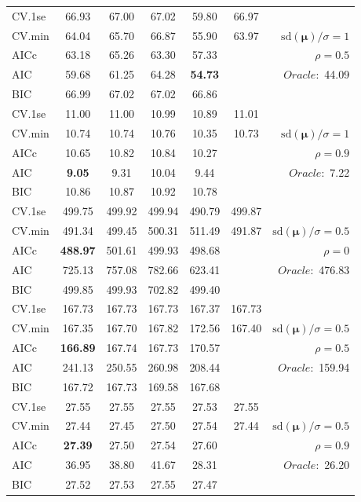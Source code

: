 \begin{table}
\begin{center}
\begin{tabular}{l*{5}{c}|r}
 \hline 
CV.1se & 66.93 & 67.00 & 67.02 & 59.80 & 66.97 & \\
CV.min & 64.04 & 65.70 & 66.87 & 55.90 & 63.97 &  $\mathrm{sd}(\mathbf{\mu})/\sigma=1$ \\
AICc & 63.18 & 65.26 & 63.30 & 57.33 & & $\rho=0.5$ \\
AIC & 59.68 & 61.25 & 64.28 & {\bf 54.73} & &  \multirow{2}{*}{$Oracle: $ 44.09} \\
BIC & 66.99 & 67.02 & 67.02 & 66.86 & &  \\
 \hline 
CV.1se & 11.00 & 11.00 & 10.99 & 10.89 & 11.01 & \\
CV.min & 10.74 & 10.74 & 10.76 & 10.35 & 10.73 &  $\mathrm{sd}(\mathbf{\mu})/\sigma=1$ \\
AICc & 10.65 & 10.82 & 10.84 & 10.27 & & $\rho=0.9$ \\
AIC & {\bf 9.05} & 9.31 & 10.04 & 9.44 & &  \multirow{2}{*}{$Oracle: $ 7.22} \\
BIC & 10.86 & 10.87 & 10.92 & 10.78 & &  \\
 \hline 
CV.1se & 499.75 & 499.92 & 499.94 & 490.79 & 499.87 & \\
CV.min & 491.34 & 499.45 & 500.31 & 511.49 & 491.87 &  $\mathrm{sd}(\mathbf{\mu})/\sigma=0.5$ \\
AICc & {\bf 488.97} & 501.61 & 499.93 & 498.68 & & $\rho=0$ \\
AIC & 725.13 & 757.08 & 782.66 & 623.41 & &  \multirow{2}{*}{$Oracle: $ 476.83} \\
BIC & 499.85 & 499.93 & 702.82 & 499.40 & &  \\
 \hline 
CV.1se & 167.73 & 167.73 & 167.73 & 167.37 & 167.73 & \\
CV.min & 167.35 & 167.70 & 167.82 & 172.56 & 167.40 &  $\mathrm{sd}(\mathbf{\mu})/\sigma=0.5$ \\
AICc & {\bf 166.89} & 167.74 & 167.73 & 170.57 & & $\rho=0.5$ \\
AIC & 241.13 & 250.55 & 260.98 & 208.44 & &  \multirow{2}{*}{$Oracle: $ 159.94} \\
BIC & 167.72 & 167.73 & 169.58 & 167.68 & &  \\
 \hline 
CV.1se & 27.55 & 27.55 & 27.55 & 27.53 & 27.55 & \\
CV.min & 27.44 & 27.45 & 27.50 & 27.54 & 27.44 &  $\mathrm{sd}(\mathbf{\mu})/\sigma=0.5$ \\
AICc & {\bf 27.39} & 27.50 & 27.54 & 27.60 & & $\rho=0.9$ \\
AIC & 36.95 & 38.80 & 41.67 & 28.31 & &  \multirow{2}{*}{$Oracle: $ 26.20} \\
BIC & 27.52 & 27.53 & 27.55 & 27.47 & &  \\
 \hline 
\end{tabular}
\end{center}
\vspace{-1cm}
\end{table}




